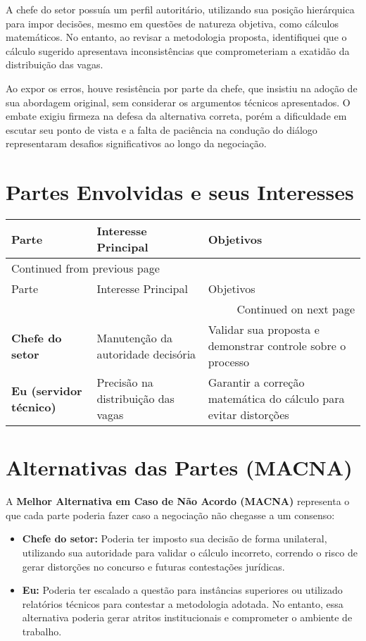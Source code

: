 \documentclass[11pt]{article}
\begin{document}
A chefe do setor possuía um perfil autoritário, utilizando sua posição hierárquica para impor decisões, mesmo em questões de natureza objetiva, como cálculos matemáticos. No entanto, ao revisar a metodologia proposta, identifiquei que o cálculo sugerido apresentava inconsistências que comprometeriam a exatidão da distribuição das vagas.

Ao expor os erros, houve resistência por parte da chefe, que insistiu na adoção de sua abordagem original, sem considerar os argumentos técnicos apresentados. O embate exigiu firmeza na defesa da alternativa correta, porém a dificuldade em escutar seu ponto de vista e a falta de paciência na condução do diálogo representaram desafios significativos ao longo da negociação.
\section*{Partes Envolvidas e seus Interesses}
\label{sec:orgc6778fd}
\begin{longtable}{l p{} p{}}
Parte & Interesse Principal & Objetivos\\
\hline
\endfirsthead
\multicolumn{3}{l}{Continued from previous page} \\
\hline

Parte & Interesse Principal & Objetivos \\

\hline
\endhead
\hline\multicolumn{3}{r}{Continued on next page} \\
\endfoot
\endlastfoot
\hline
\textbf{Chefe do setor} & Manutenção da autoridade decisória & Validar sua proposta e demonstrar controle sobre o processo\\
\hline
\textbf{Eu (servidor técnico)} & Precisão na distribuição das vagas & Garantir a correção matemática do cálculo para evitar distorções\\
\end{longtable}
\section*{Alternativas das Partes (MACNA)}
\label{sec:orgc1a6152}
A \textbf{Melhor Alternativa em Caso de Não Acordo (MACNA)} representa o que cada parte poderia fazer caso a negociação não chegasse a um consenso:

\begin{itemize}
\item \textbf{Chefe do setor:} Poderia ter imposto sua decisão de forma unilateral, utilizando sua autoridade para validar o cálculo incorreto, correndo o risco de gerar distorções no concurso e futuras contestações jurídicas.
\item \textbf{Eu:} Poderia ter escalado a questão para instâncias superiores ou utilizado relatórios técnicos para contestar a metodologia adotada. No entanto, essa alternativa poderia gerar atritos institucionais e comprometer o ambiente de trabalho.
\end{itemize}
\end{document}
